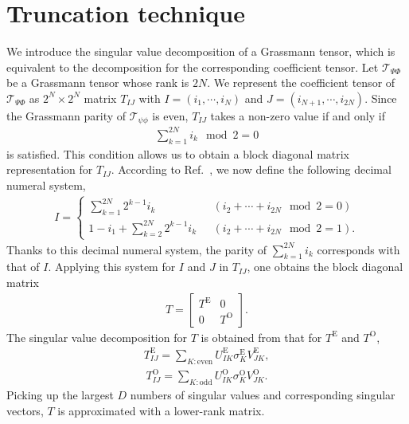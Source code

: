 
\section{Truncation technique}
\label{sec:truncation}

We introduce the singular value decomposition of a Grassmann tensor, 
which is equivalent to the decomposition for the corresponding coefficient tensor. 
Let $\mathcal{T}_{\Psi\Phi}$ be a Grassmann tensor whose rank is $2N$. 
We represent the coefficient tensor of $\mathcal{T}_{\Psi\Phi}$ as $2^{N}\times2^{N}$ 
matrix $T_{IJ}$ with $I=(i_{1},\cdots,i_{N})$ and $J=(i_{N+1},\cdots,i_{2N})$. 
Since the Grassmann parity of $\mathcal{T}_{\psi\phi}$ is even, $T_{IJ}$ takes a non-zero value if and only if
\begin{align}
	\sum_{k=1}^{2N}i_{k}\mod2=0
\end{align}
is satisfied. This condition allows us to obtain a block diagonal matrix representation for $T_{IJ}$. According to Ref.~\cite{Kadoh}, we now define the following decimal numeral system,
\begin{align}
	I=
	\begin{cases}
		\sum_{k=1}^{2N}2^{k-1}i_{k}~~~&(i_{2}+\cdots+i_{2N}\mod2=0) \\
		1-i_{1}+\sum_{k=2}^{2N}2^{k-1}i_{k}~~~&(i_{2}+\cdots+i_{2N}\mod2=1).
	\end{cases}
\end{align}
Thanks to this decimal numeral system, the parity of $\sum_{k=1}^{2N}i_{k}$ corresponds with that of $I$. Applying this system for $I$ and $J$ in $T_{IJ}$, one obtains the block diagonal matrix
\begin{align}
	T=
	\begin{bmatrix}
		T^{\mathrm{E}} & 0 \\
		0 & T^{\mathrm{O}}
	\end{bmatrix}
	.
\end{align} 
The singular value decomposition for $T$ is obtained from that for $T^{\mathrm{E}}$ and $T^{\mathrm{O}}$,
\begin{align}
\label{eq:even}
	T^{\mathrm{E}}_{IJ}=\sum_{K:\mathrm{even}}U^{\mathrm{E}}_{IK}\sigma^{\mathrm{E}}_{K}V^{\mathrm{E}}_{JK},
\end{align}
\begin{align}
\label{eq:odd}
	T^{\mathrm{O}}_{IJ}=\sum_{K:\mathrm{odd}}U^{\mathrm{O}}_{IK}\sigma^{\mathrm{O}}_{K}V^{\mathrm{O}}_{JK}.
\end{align}
Picking up the largest $D$ numbers of singular values and corresponding singular vectors, $T$ is approximated with a lower-rank matrix. 

